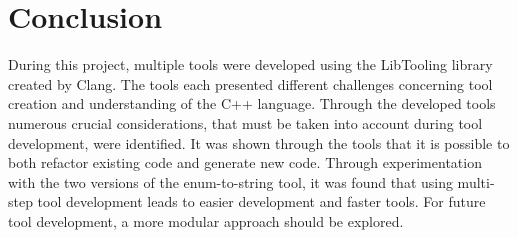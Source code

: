 \chapter{Conclusion}

During this project, multiple tools were developed using the LibTooling library created by Clang. 
The tools each presented different challenges concerning tool creation and understanding of the C++ language. 
Through the developed tools numerous crucial considerations, that must be taken into account during tool development, were identified.
It was shown through the tools that it is possible to both refactor existing code and generate new code.
Through experimentation with the two versions of the enum-to-string tool, it was found that using multi-step tool development leads to easier development and faster tools.
For future tool development, a more modular approach should be explored.